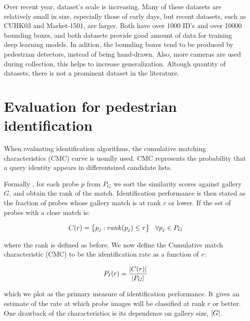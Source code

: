 Over recent year, dataset's scale is increasing. Many of these datasets are relatively small in size, especially those of early days, but recent datasets, such as CUHK03 and Market-1501, are larger. Both have over 1000 ID's and over 10000 bounding boxes, and both datasets provide good amount of data for training deep learning models. In adition, the bounding boxes tend to be produced by pedestrian detectors, instead of being hand-drawn. Also, more cameras are used during collection, this helps to increase generalization. Altough quantity of datasets, there is not a prominent dataset in the literature.

\section{Evaluation for pedestrian identification}


When evaluating identification algorithms, the cumulative matching characteristics (CMC) curve is usually used. CMC represents the probability that a query identity appears in differentsized candidate lists.

Formally \cite{faceCMC}, for each probe $p$ from $P_{G}$ we sort the similarity scores against gallery $G$, and obtain the rank of the match. Identification performance is then stated as the fraction of probes whose gallery match is at rank $r$  or lower. If the set of probes with a close match is:

$$ C(r) = \big\{ p_{j}: rank(p_{j}) \leq r  \bigr\} \hspace{0.3cm} \forall p_{j} \in P_{G}  $$

where the rank is defined as before. We now define the Cumulative match characteristic (CMC) to be the identification rate as a function of $r$:

$$ P_{I}(r) = \dfrac{\left|C(r)\right|}{\left|P_{G}\right|} $$

which we plot as the primary measure of identification performance. It gives an estimate of the rate at which probe images will be classified at rank $r$ or better. One drawback of the characteristics is its dependence on gallery size, $\left|G\right|$.